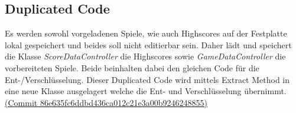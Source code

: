 \subsection{Duplicated Code}

Es werden sowohl vorgeladenen Spiele, wie auch Highscores auf der Festplatte lokal gespeichert und beides soll nicht editierbar sein. Daher lädt und speichert die Klasse \textit{ScoreDataController} die Highscores sowie \textit{GameDataController} die vorbereiteten Spiele. Beide beinhalten dabei den gleichen Code für die Ent-/Verschlüsselung. Dieser Duplicated Code wird mittels Extract Method in eine neue Klasse ausgelagert welche die Ent- und Verschlüsselung übernimmt. \href{https://github.com/EinToni/Wortfinder/commit/86e635fc6ddbd436ca012c21e3a00b9246248855}{(Commit 86e635fc6ddbd436ca012c21e3a00b9246248855)}

\endinput